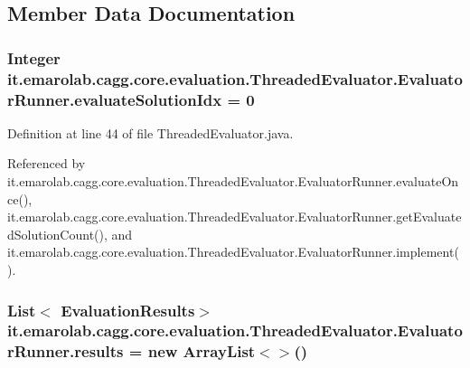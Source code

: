 \subsection{Member Data Documentation}
\hypertarget{classit_1_1emarolab_1_1cagg_1_1core_1_1evaluation_1_1ThreadedEvaluator_1_1EvaluatorRunner_af164a42dd65c05e231c6ae6abf701787}{
\subsubsection[{evaluate\-Solution\-Idx}]{\setlength{\rightskip}{0pt plus 5cm}Integer it.\-emarolab.\-cagg.\-core.\-evaluation.\-Threaded\-Evaluator.\-Evaluator\-Runner.\-evaluate\-Solution\-Idx = 0\hspace{0.3cm}{\ttfamily [private]}}}\label{classit_1_1emarolab_1_1cagg_1_1core_1_1evaluation_1_1ThreadedEvaluator_1_1EvaluatorRunner_af164a42dd65c05e231c6ae6abf701787}


Definition at line 44 of file Threaded\-Evaluator.\-java.



Referenced by it.\-emarolab.\-cagg.\-core.\-evaluation.\-Threaded\-Evaluator.\-Evaluator\-Runner.\-evaluate\-Once(), it.\-emarolab.\-cagg.\-core.\-evaluation.\-Threaded\-Evaluator.\-Evaluator\-Runner.\-get\-Evaluated\-Solution\-Count(), and it.\-emarolab.\-cagg.\-core.\-evaluation.\-Threaded\-Evaluator.\-Evaluator\-Runner.\-implement().

\hypertarget{classit_1_1emarolab_1_1cagg_1_1core_1_1evaluation_1_1ThreadedEvaluator_1_1EvaluatorRunner_af51b192937c6518b825ed3bed7960d82}{
\subsubsection[{results}]{\setlength{\rightskip}{0pt plus 5cm}List$<$ Evaluation\-Results$>$ it.\-emarolab.\-cagg.\-core.\-evaluation.\-Threaded\-Evaluator.\-Evaluator\-Runner.\-results = new Array\-List$<$$>$()\hspace{0.3cm}{\ttfamily [private]}}}\label{classit_1_1emarolab_1_1cagg_1_1core_1_1evaluation_1_1ThreadedEvaluator_1_1EvaluatorRunner_af51b192937c6518b825ed3bed7960d82}


